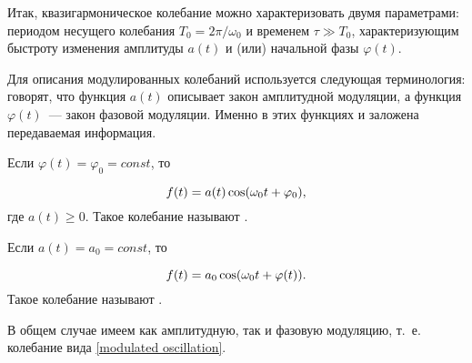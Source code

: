 Итак, квазигармоническое колебание можно характеризовать двумя параметрами: периодом несущего колебания
$T_0=2\pi/\omega_0$ и временем $\tau \gg T_0$, характеризующим быстроту изменения амплитуды $a(t)$ и (или) начальной
фазы $\varphi(t)$.

%
Для описания модулированных колебаний используется
следующая терминология: говорят, что функция $a(t)$ описывает закон амплитудной модуляции, а функция $\varphi(t)$~--- закон
фазовой модуляции. Именно в этих функциях и заложена передаваемая информация.

Если $\varphi(t)=\varphi_0=const$, то

\begin{equation}
	\eqmark{amplitude-modulated}
	f(t)=a(t)\cos(\omega_0t+\varphi_0),
\end{equation}
где $a(t)\ge0$. Такое колебание называют .

Если $a(t)=a_0=const$, то

\begin{equation}
	\eqmark{phase-modulated}
	f(t)=a_0 \cos(\omega_0t+\varphi(t)).
\end{equation}
Такое колебание называют .

В общем случае имеем как амплитудную, так и фазовую модуляцию, т.~е. колебание вида \eqref{modulated oscillation}.




